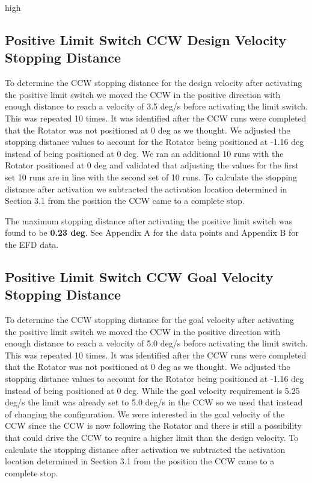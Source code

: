 high\documentclass[SE,lsstdraft,authoryear,toc]{lsstdoc}
\begin{document}
\subsection{Positive Limit Switch CCW Design Velocity Stopping Distance}

To determine the CCW stopping distance for the design velocity after
activating the positive limit switch we moved the CCW in the positive
direction with enough distance to reach a velocity of 3.5 deg/s before
activating the limit switch. This was repeated 10 times. It was
identified after the CCW runs were completed that the Rotator was not
positioned at 0 deg as we thought. We adjusted the stopping distance
values to account for the Rotator being positioned at -1.16 deg instead
of being positioned at 0 deg. We ran an additional 10 runs with the
Rotator positioned at 0 deg and validated that adjusting the values for
the first set 10 runs are in line with the second set of 10 runs. To
calculate the stopping distance after activation we subtracted the
activation location determined in Section 3.1 from the position the CCW
came to a complete stop.

The maximum stopping distance after activating the positive limit switch
was found to be \textbf{0.23 deg}. See Appendix A for the data points
and Appendix B for the EFD data.

\subsection{Positive Limit Switch CCW Goal Velocity Stopping Distance}

To determine the CCW stopping distance for the goal velocity after
activating the positive limit switch we moved the CCW in the positive
direction with enough distance to reach a velocity of 5.0 deg/s before
activating the limit switch. This was repeated 10 times. It was
identified after the CCW runs were completed that the Rotator was not
positioned at 0 deg as we thought. We adjusted the stopping distance
values to account for the Rotator being positioned at -1.16 deg instead
of being positioned at 0 deg. While the goal velocity requirement is
5.25 deg/s the limit was already set to 5.0 deg/s in the CCW so we used
that instead of changing the configuration. We were interested in the
goal velocity of the CCW since the CCW is now following the Rotator and
there is still a possibility that could drive the CCW to require a
higher limit than the design velocity. To calculate the stopping
distance after activation we subtracted the activation location
determined in Section 3.1 from the position the CCW came to a complete
stop.
\end{document}
